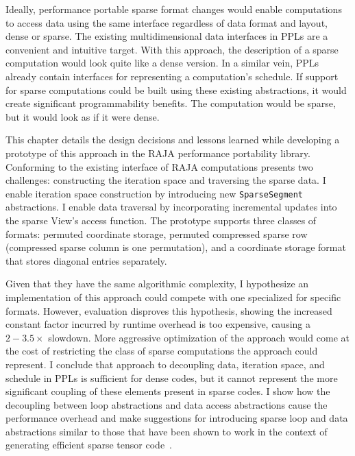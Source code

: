 Ideally, performance portable sparse format changes would enable computations to access data using the same interface regardless of data format and layout, dense or sparse.
The existing multidimensional data interfaces in PPLs are a convenient and intuitive target.
With this approach, the description of a sparse computation would look quite like a dense version.
In a similar vein, PPLs already contain interfaces for representing a computation's schedule.
If support for sparse computations could be built using these existing abstractions, it would create significant programmability benefits.
The computation would be sparse, but it would look as if it were dense.
 
This chapter details the design decisions and lessons learned while developing a prototype of this approach in the RAJA performance portability library.
Conforming to the existing interface of RAJA computations presents two challenges: constructing the iteration space and traversing the sparse data.
I enable iteration space construction by introducing new \verb.SparseSegment. abstractions.
I enable data traversal by incorporating incremental updates into the sparse View's access function.
The prototype supports three classes of formats: permuted coordinate storage, permuted compressed sparse row (compressed sparse column is one permutation), and a coordinate storage format that stores diagonal entries separately.

Given that they have the same algorithmic complexity, I hypothesize an implementation of this approach could compete with one specialized for specific formats.
However, evaluation disproves this hypothesis, showing the increased constant factor incurred by runtime overhead is too expensive, causing a $2-3.5\times$ slowdown.
More aggressive optimization of the approach would come at the cost of restricting the class of sparse computations the approach could represent.
I conclude that approach to decoupling data, iteration space, and schedule in PPLs is sufficient for dense codes, but it cannot represent the more significant coupling of these elements present in sparse codes.
I show how the decoupling between loop abstractions and data access abstractions cause the performance overhead and make suggestions for introducing sparse loop and data abstractions similar to those that have been shown to work in the context of generating efficient sparse tensor code~\cite{kjolstad2017tensor}. 

